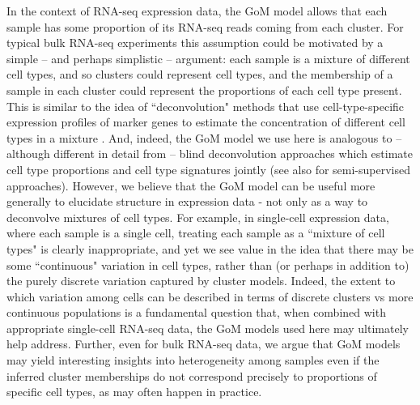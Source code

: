 

In the context of RNA-seq expression data, the GoM model allows that each
 sample has some proportion of its RNA-seq reads coming from each cluster. For typical bulk RNA-seq experiments this assumption 
could be motivated by a simple -- and perhaps simplistic -- argument: each sample is a mixture of different cell types, and so clusters 
could represent cell types, and the membership of a sample in each cluster could represent the proportions of each cell type present.
This is similar to the idea of ``deconvolution" methods that use cell-type-specific expression profiles of marker genes to estimate the concentration of different cell types in a mixture \cite{Lindsay2013}. And, indeed, the GoM model we use here is analogous to -- although different in detail from -- 
blind deconvolution approaches \cite{Schwartz2010,Repsilber2010}
 which estimate cell type proportions and cell type signatures jointly (see also \cite{Shen-Orr2010,Qiao2012} for semi-supervised approaches). 
However, we believe that the GoM model can be useful more generally to elucidate structure in expression data - not only as a way to deconvolve 
mixtures of cell types. For example, in single-cell expression data, where each sample is a single cell, 
treating each sample as a ``mixture of cell types" is clearly inappropriate, and yet we see value in the idea
that there may be some ``continuous" variation in cell types, rather than (or perhaps in addition to) the purely discrete variation captured by cluster models. 
Indeed, the extent to which variation among cells can be described in terms of discrete clusters vs more continuous populations
is a fundamental question that, when combined with appropriate single-cell RNA-seq data, the GoM models used here may
ultimately help address. Further, even for bulk RNA-seq data, we argue that GoM models may yield interesting insights into heterogeneity among samples
even if the inferred cluster memberships do not correspond precisely to proportions of specific cell types, as may often happen in practice.

